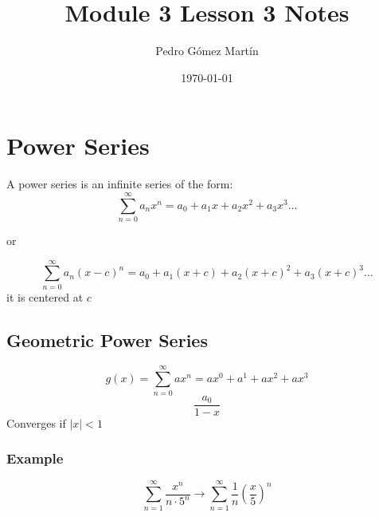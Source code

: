 \documentclass{article}
\author{Pedro G\'{o}mez Mart\'{i}n}
\date{\today}
\title{Module 3 Lesson 3 Notes}
\begin{document}
\maketitle
\section{Power Series}
A power series is an infinite series of the form:
\begin{equation*}
\sum\limits_{n=0}^{\infty}{a_{n}x^n}=a_{0}+a_{1}x+a_{2}x^{2}+a_{3}x^{3}\dots
\end{equation*}
\begin{center}
or
\end{center}
\begin{equation*}
\sum\limits_{n=0}^{\infty}{a_{n}\left(x-c\right)^n}=a_{0}+a_{1}\left(x+c\right)+a_{2}\left(x+c\right)^{2}+a_{3}\left(x+c\right)^{3}\dots
\end{equation*}
it is centered at $c$
\subsection{Geometric Power Series}
\begin{multicols}{3}
\begin{equation*}
g\left(x\right)=\sum\limits_{n=0}^{\infty}{ax^{n}}=ax^{0}+a^{1}+ax^{2}+ax^{3}
\end{equation*}
\columnbreak
\begin{equation*}
\frac{a_0}{1-x}
\end{equation*}
\vfill\null
\columnbreak
Converges if $\left|x\right|<1$ 
\end{multicols}
\subsubsection*{Example}
\begin{equation*}
\sum\limits_{n=1}^{\infty}{\frac{x^{n}}{n\cdot 5^n}}\rightarrow\sum\limits_{n=1}^{\infty}{\frac{1}{n}\left(\frac{x}{5}\right)^{n}}
\end{equation*}
\end{document}

